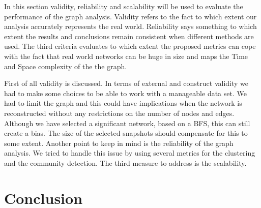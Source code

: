 \documentclass[10pt,a4paper]{article}
\begin{document}
\begin{multicols}{2}
In this section validity, reliability and scalability will be used to evaluate the performance of the graph analysis. Validity refers to the fact to which extent our analysis accurately represents the real world. Reliability says something to which extent the results and conclusions remain consistent when different methods are used. The third criteria evaluates to which extent the proposed metrics can cope with the fact that real world networks can be huge in size and maps the Time and Space complexity of the the graph. 

First of all validity is discussed. In terms of external and construct validity we had to make some choices to be able to work with a manageable data set. We had to limit the graph and this could have implications when the network is reconstructed without any restrictions on the number of nodes and edges. Although we have selected a significant network, based on a BFS, this can still create a bias. The size of the selected snapshots should compensate for this to some extent. Another point to keep in mind is the reliability of the graph analysis. We tried to handle this issue by using several metrics for the clustering and the community detection. The third measure to address is the scalability. 


\section{Conclusion}


\end{multicols}


\end{document}
